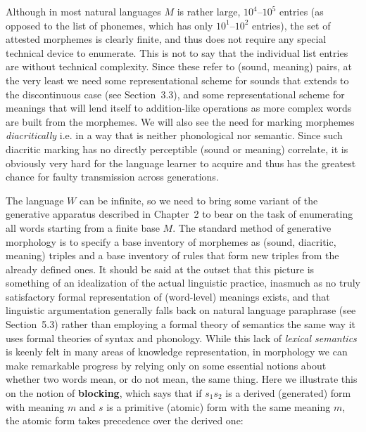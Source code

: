 
Although in most natural languages $M$ is rather large, $10^4$--$10^5$ entries
(as opposed to the list of phonemes, which has only $10^1$--$10^2$ entries),
the set of attested morphemes is clearly finite, and thus does not require any
special technical device to enumerate.  This is not to say that the individual
list entries are without technical complexity. Since these refer to (sound,
meaning) pairs, at the very least we need some representational scheme for
sounds that extends to the discontinuous case (see Section~3.3), and some
representational scheme for meanings that will lend itself to addition-like
operations as more complex words are built from the morphemes.  We will also
see the need for marking morphemes {\it diacritically} i.e.
in a way that is neither phonological nor semantic.  Since such diacritic
marking has no directly perceptible (sound or meaning) correlate, it is
obviously very hard for the language learner to acquire and thus has the
greatest chance for faulty transmission across generations.

The language $W$ can be infinite, so we need to bring some variant of the
generative apparatus described in Chapter~2 to bear on the task of enumerating
all words starting from a finite base $M$. The standard method of generative
morphology is to specify a base inventory of morphemes as (sound, diacritic,
meaning) triples and a base inventory of rules that form new triples from the
already defined ones. It should be said at the outset that this picture is
something of an idealization of the actual linguistic practice, inasmuch as no
truly satisfactory formal representation of (word-level) meanings exists, and
that linguistic argumentation generally falls back on natural language
paraphrase (see Section~5.3) rather than employing a formal theory of
semantics the same way it uses formal theories of syntax and phonology. While
this lack of {\sl lexical semantics} is keenly felt in many areas of knowledge
representation, in morphology we can make remarkable progress by relying only
on some essential notions about whether two words mean, or do not mean, the
same thing. Here we illustrate this on the notion of {\bf
  blocking}, which says that if $s_1s_2$ is a derived
(generated) form with meaning $m$ and $s$ is a primitive (atomic) form with
the same meaning $m$, the atomic form takes precedence over the derived one:

